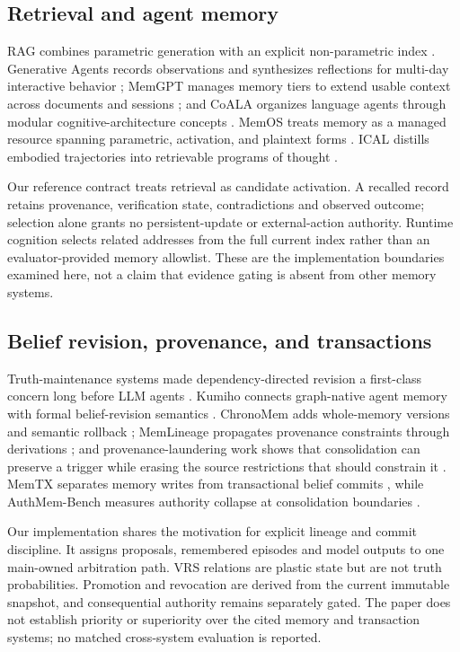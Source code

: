 \documentclass[11pt]{article}
\newcommand{\vrs}{VRS}
\begin{document}
\subsection{Retrieval and agent memory}

RAG combines parametric generation with an explicit non-parametric index \cite{lewis2020rag}.  Generative Agents records observations and synthesizes reflections for multi-day interactive behavior \cite{park2023generative}; MemGPT manages memory tiers to extend usable context across documents and sessions \cite{packer2023memgpt}; and CoALA organizes language agents through modular cognitive-architecture concepts \cite{sumers2024coala}.  MemOS treats memory as a managed resource spanning parametric, activation, and plaintext forms \cite{li2025memos}.  ICAL distills embodied trajectories into retrievable programs of thought \cite{sarch2024ical}.

Our reference contract treats retrieval as candidate activation. A recalled record retains provenance, verification state, contradictions and observed outcome; selection alone grants no persistent-update or external-action authority. Runtime cognition selects related addresses from the full current index rather than an evaluator-provided memory allowlist. These are the implementation boundaries examined here, not a claim that evidence gating is absent from other memory systems.

\subsection{Belief revision, provenance, and transactions}

Truth-maintenance systems made dependency-directed revision a first-class concern long before LLM agents \cite{doyle1979tms}.  Kumiho connects graph-native agent memory with formal belief-revision semantics \cite{park2026kumiho}.  ChronoMem adds whole-memory versions and semantic rollback \cite{su2026chronomem}; MemLineage propagates provenance constraints through derivations \cite{ouyang2026memlineage}; and provenance-laundering work shows that consolidation can preserve a trigger while erasing the source restrictions that should constrain it \cite{xu2026provenance}.  MemTX separates memory writes from transactional belief commits \cite{li2026memtx}, while AuthMem-Bench measures authority collapse at consolidation boundaries \cite{zhan2026authority}.

Our implementation shares the motivation for explicit lineage and commit discipline. It assigns proposals, remembered episodes and model outputs to one main-owned arbitration path. \vrs{} relations are plastic state but are not truth probabilities. Promotion and revocation are derived from the current immutable snapshot, and consequential authority remains separately gated. The paper does not establish priority or superiority over the cited memory and transaction systems; no matched cross-system evaluation is reported.
\end{document}
